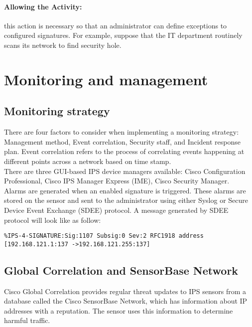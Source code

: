 \paragraph{Allowing the Activity:} this action is necessary so that an administrator can define exceptions to configured signatures. For example, suppose that the IT department routinely scans its network to find security hole. 


\section{Monitoring and management} 

\subsection{Monitoring strategy}

There are four factors to consider when implementing a monitoring strategy: Management method, Event correlation, Security staff, and Incident response plan. Event correlation refers to the process of correlating events happening at different points across a network based on time stamp. \\

There are three GUI-based IPS device managers available: Cisco Configuration Professional, Cisco IPS Manager Express (IME), Cisco Security Manager.\\

Alarms are generated when an enabled signature is triggered. These alarms are stored on the sensor and sent to the administrator using either Syslog or Secure Device Event Exchange (SDEE) protocol. A message generated by SDEE protocol will look like as follow:

\begin{verbatim}
%IPS-4-SIGNATURE:Sig:1107 Subsig:0 Sev:2 RFC1918 address [192.168.121.1:137 ->192.168.121.255:137] 
\end{verbatim}

\subsection{Global Correlation and SensorBase Network}

Cisco Global Correlation provides regular threat updates to IPS sensors from a database called the Cisco SensorBase Network, which has information about IP addresses with a reputation. The sensor uses this information to determine harmful traffic. \\


